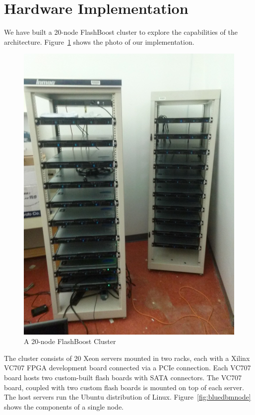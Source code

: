 \section{Hardware Implementation}

We have built a 20-node FlashBoost cluster to explore the capabilities of the
architecture. Figure~\ref{fig:bluedbmcluster} shows the photo of our
implementation.

\begin{figure}[ht]
	\begin{center}
	\includegraphics[width=0.3\paperwidth]{figures/rack.jpg}
	\caption{A 20-node FlashBoost Cluster}
	\label{fig:bluedbmcluster}
	\end{center}
\end{figure}

The cluster consists of 20 Xeon servers mounted in two racks, each with a Xilinx
VC707 FPGA development board connected via a PCIe connection. Each VC707 board
hosts two custom-built flash boards with SATA connectors. The VC707 board,
coupled with two custom flash boards is mounted on top of each server.
The host servers run the Ubuntu distribution of Linux.
Figure~\ref{fig:bluedbmnode} shows the components of a single node.

